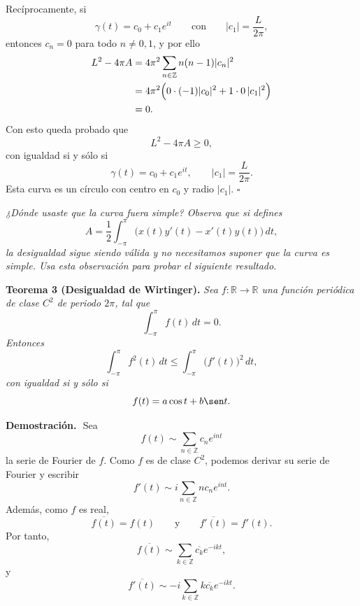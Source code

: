 \documentclass[11pt,letterpaper]{article}
\newcommand{\R}{\mathbb{R}}
\newcommand{\Z}{\mathbb{Z}}
\begin{document}
Recíprocamente, si
\begin{equation*}
    \gamma(t)=c_0+c_1e^{it}
    \qquad\text{con}\qquad
    |c_1|=\frac{L}{2\pi},
\end{equation*}
entonces $c_n=0$ para todo $n\neq 0,1$, y por ello
\begin{align*}
    L^2-4\pi A
    &=4\pi^2\sum_{n\in\Z}n(n-1)|c_n|^2 \\
    &=4\pi^2\Bigl(0\cdot(-1)|c_0|^2+1\cdot 0\,|c_1|^2\Bigr) \\
    &=0.
\end{align*}
Con esto queda probado que
\begin{equation*}
    L^2-4\pi A\ge 0,
\end{equation*}
con igualdad si y sólo si
\begin{equation*}
    \gamma(t)=c_0+c_1e^{it},
    \qquad |c_1|=\frac{L}{2\pi}.
\end{equation*}
Esta curva es un círculo con centro en $c_0$ y radio $|c_1|$.
\hfill $\square$
\begin{tcolorbox}[title=\textcolor{white}{Problema 17}]
\textit{¿Dónde usaste que la curva fuera simple? Observa que si defines}
\begin{equation*}
    A=\frac12\int_{-\pi}^{\pi}\bigl(x(t)y'(t)-x'(t)y(t)\bigr)\,dt,
\end{equation*}
\textit{la desigualdad sigue siendo válida y no necesitamos suponer que la curva es simple. Usa esta observación para probar el siguiente resultado.}

\medskip
\textbf{Teorema 3 (Desigualdad de Wirtinger).} \textit{Sea $f:\R\to\R$ una función periódica de clase $C^2$ de periodo $2\pi$, tal que}
\begin{equation*}
    \int_{-\pi}^{\pi} f(t)\,dt=0.
\end{equation*}
\textit{Entonces}
\begin{equation*}
    \int_{-\pi}^{\pi} f^2(t)\,dt \leq \int_{-\pi}^{\pi} \bigl(f'(t)\bigr)^2\,dt,
\end{equation*}
\textit{con igualdad si y sólo si}
\begin{equation*}
    f(t)=a\cos t+b\sen t.
\end{equation*}
\end{tcolorbox}
\textbf{Demostración.}\,\
Sea
\begin{equation*}
    f(t)\sim \sum_{n\in\Z}c_ne^{int}
\end{equation*}
la serie de Fourier de $f$. Como $f$ es de clase $C^2$, podemos derivar su serie de Fourier y escribir
\begin{equation*}
    f'(t)\sim i\sum_{n\in\Z}n c_ne^{int}.
\end{equation*}
Además, como $f$ es real,
\begin{equation*}
    \overline{f(t)}=f(t)
    \qquad\text{y}\qquad
    \overline{f'(t)}=f'(t).
\end{equation*}
Por tanto,
\begin{equation*}
    \overline{f(t)}\sim \sum_{k\in\Z}\overline{c_k}e^{-ikt},
\end{equation*}
y
\begin{equation*}
    \overline{f'(t)}
    \sim -i\sum_{k\in\Z}k\overline{c_k}e^{-ikt}.
\end{equation*}
\end{document}
